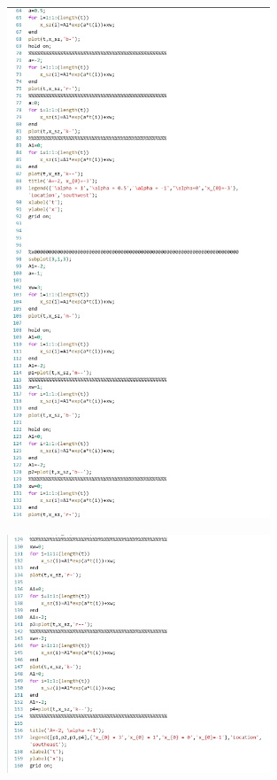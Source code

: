 \documentclass{article}
\begin{document}
\begin{figure}
    \centering
    \includegraphics[width=0.7\textwidth]{a_2_m.png}
    \label{fig:my_label}
\end{figure}
\begin{figure}
    \centering
    \includegraphics[width=0.7\textwidth]{a_3_m.png}
    \label{fig:my_label}
\end{figure}
\end{document}
